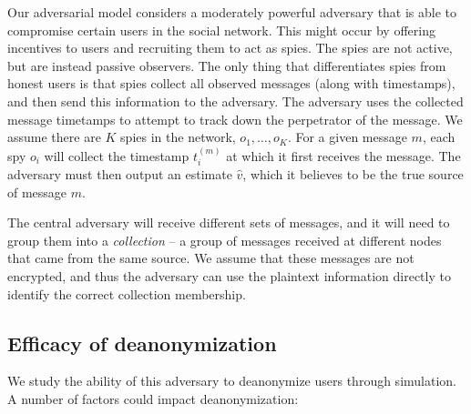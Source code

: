 Our adversarial model considers a moderately powerful adversary that is able to compromise certain users in the social network. This might occur by offering incentives to users and recruiting them to act as spies. The spies are not active, but are instead passive observers. The only thing that differentiates spies from honest users is that spies collect all observed messages (along with timestamps), and then send this information to the adversary. The adversary uses the collected message timetamps to attempt to track down the perpetrator of the message.
We assume there are $K$ spies in the network, $o_1,\ldots,o_K$. For a given message $m$, each spy $o_i$ will collect the timestamp $t_i^{(m)}$ at which it first receives the message. The adversary must then output an estimate $\hat v$, which it believes to be the true source of message $m$. %

The central adversary will receive different sets of messages, and it will need to group them into a \emph{collection} -- a group of messages received at different nodes that came from the same source. We assume that these messages are not encrypted, and thus the adversary can use the plaintext information directly to identify the correct collection membership. 

\subsection{Efficacy of deanonymization}

We study the ability of this adversary to deanonymize users through simulation. A number of factors could impact deanonymization:

